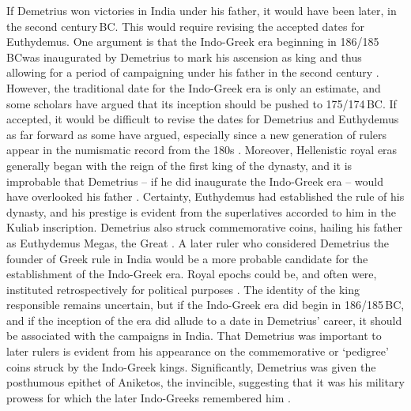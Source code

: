\documentclass{ijsra}
\renewcommand\BC{{\,BC\xspace}}
\begin{document}
If Demetrius won victories in India under his father, it would have been later, in the second century\BC.
This would require revising the accepted dates for Euthydemus.
One argument is that the Indo-Greek era beginning in 186/185\BC was inaugurated by Demetrius to mark his ascension as king
and thus allowing for a period of campaigning under his father in the second century \parencite[104--105]{MacDowall2007a}.
However, the traditional date for the Indo-Greek era is only an estimate, and some scholars have argued that its inception
should be pushed to 175/174\BC \parencites[48]{Bopearachchi2011}[210--211]{Falk2009}.
If accepted, it would be difficult to revise the dates for Demetrius and Euthydemus as far forward as some have argued,
especially since a new generation of rulers appear in the numismatic record from the 180s \parencite[505]{Jakobsson2009}.
Moreover, Hellenistic royal eras generally began with the reign of the first king of the dynasty,
and it is improbable that Demetrius – if he did inaugurate the Indo-Greek era – would have overlooked his father \parencite[506]{Jakobsson2009}.
Certainty, Euthydemus had established the rule of his dynasty, and his prestige is evident from the superlatives accorded to him
in the Kuliab inscription.
Demetrius also struck commemorative coins, hailing his father as Euthydemus Megas, the Great \parencite[111]{Hollis2011}.
A later ruler who considered Demetrius the founder of Greek rule in India would be a more probable candidate for the establishment
of the Indo-Greek era.
Royal epochs could be, and often were, instituted retrospectively for political purposes \parencite[506]{Jakobsson2009}.
The identity of the king responsible remains uncertain, but if the Indo-Greek era did begin in 186/185\BC, and if the inception
of the era did allude to a date in Demetrius’ career, it should be associated with the campaigns in India.
That Demetrius was important to later rulers is evident from his appearance on the commemorative or ‘pedigree’ coins struck by
the Indo-Greek kings.
Significantly, Demetrius was given the posthumous epithet of Aniketos, the invincible,
suggesting that it was his military prowess for which the later Indo-Greeks remembered him \parencite[48]{Bopearachchi2011}.
\end{document}
